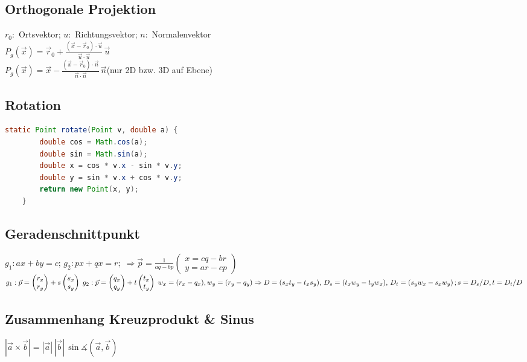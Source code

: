 \documentclass[10pt,a4paper,ngerman,oneside,]{article}
\begin{document}
\begin{multicols}{2}
\subsection{Orthogonale Projektion}
$r_0:$ Ortsvektor; $u:$ Richtungsvektor; $n:$ Normalenvektor\\
$P_g(\vec x) =  \vec r_0 + \frac{( \vec x - \vec r_0 ) \cdot \vec u}{\vec u \cdot \vec u} \, \vec u$\\
$P_g(\vec x) = \vec x - \frac{( \vec x - \vec r_0 ) \cdot \vec n}{\vec n \cdot \vec n} \, \vec n$(nur 2D bzw. 3D auf Ebene)\\
\subsection{Rotation}
\begin{lstlisting}[language=java]
	static Point rotate(Point v, double a) {
		double cos = Math.cos(a);
		double sin = Math.sin(a);
		double x = cos * v.x - sin * v.y;
		double y = sin * v.x + cos * v.y;
		return new Point(x, y);
	}
\end{lstlisting}
\subsection{Geradenschnittpunkt}
$g_1: ax+by=c;\,g_2: px+qx=r;\;\Rightarrow \vec{p}=\frac{1}{aq-bp}\begin{pmatrix}
x = cq-br\\y=ar-cp
\end{pmatrix}$\\
$
g_1: \vec{p}=\begin{pmatrix}r_x\\r_y\end{pmatrix}+ s \begin{pmatrix}s_x\\s_y\end{pmatrix}\;
g_2: \vec{p}=\begin{pmatrix}q_x\\q_y\end{pmatrix}+ t \begin{pmatrix}t_x\\t_y\end{pmatrix}\; w_x=(r_x-q_x),  w_y=(r_y-q_y)\\
\Rightarrow D=(s_xt_y-t_xs_y),\, D_s=(t_xw_y-t_yw_x),\,
D_t=(s_yw_x-s_xw_y)\,; s=D_s/D, t=D_t/D$

\renewcommand{\tan}{\ensuremath{\operatorname{tan}}}
\renewcommand{\cot}{\ensuremath{\operatorname{cot}}}
\subsection{Zusammenhang Kreuzprodukt \& Sinus}
$|\vec{a}\times\vec{b}|=|\vec{a}| \, | \vec{b} | \, \sin \measuredangle (\vec{a},\vec{b})$

\end{multicols}
\end{document}

